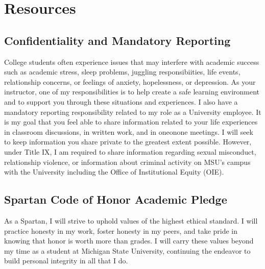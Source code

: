 \documentclass[letterpaper,10pt,english]{jupyterBook}
\begin{document}
\sphinxAtStartPar
{}

\sphinxstepscope


\section{Resources}
\label{\detokenize{content/0_course/resources:resources}}\label{\detokenize{content/0_course/resources::doc}}

\subsection{Confidentiality and Mandatory Reporting}
\label{\detokenize{content/0_course/resources:confidentiality-and-mandatory-reporting}}
\sphinxAtStartPar
College students often experience issues that may interfere with academic success such as academic stress, sleep problems, juggling responsibiities, life events, relationship concerns, or feelings of anxiety, hopelessness, or depression.
As your instructor, one of my responsibilities is to help create a safe learning environment and to support you through these situations and experiences.
I also have a mandatory reporting responsibility related to my role as a University employee.
It is my goal that you feel able to share information related to your life experiences in classroom
discussions, in written work, and in one\sphinxhyphen{}on\sphinxhyphen{}one meetings.
I will seek to keep information you share private to the greatest extent possible.
However, under Title IX, I am required to share information regarding sexual misconduct, relationship violence, or information
about criminal activity on MSU’s campus with the University including the Office of Institutional Equity (OIE).

\sphinxAtStartPar
{}


\subsection{Spartan Code of Honor Academic Pledge}
\label{\detokenize{content/0_course/resources:spartan-code-of-honor-academic-pledge}}
\sphinxAtStartPar
As a Spartan, I will strive to uphold values of the highest ethical standard. I will practice honesty in my work, foster honesty in my peers, and take pride in knowing that honor is worth more than grades. I will carry these values beyond my time as a student at Michigan State University, continuing the endeavor to build personal integrity in all that I do.
\end{document}

